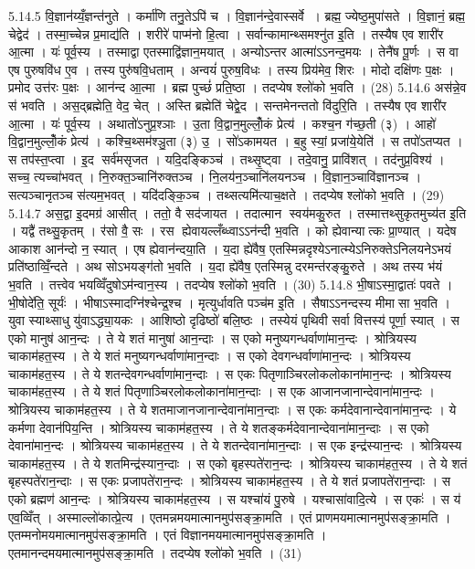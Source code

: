 5.14.5
वि॒ज्ञान॑य्यँ॒ज्ञन्त॑नुते । कर्मा॑णि तनु॒तेऽपि॑ च । वि॒ज्ञान॑न्दे॒वास्सर्वे । ब्रह्म॒ ज्येष्ठ॒मुपा॑सते । वि॒ज्ञानं॒ ब्रह्म॒ चेद्वेद॑ । तस्मा॒च्चेन्न प्र॒माद्य॑ति । शरीरे॑ पाप्म॑नो हि॒त्वा । सर्वान्कामान्थ्समश्नु॑त इ॒ति । तस्यैष एव शारी॑र आ॒त्मा । यः॑ पूर्व॒स्य । तस्माद्वा एतस्माद्वि॑ज्ञान॒मयात् । अन्योऽन्तर आत्मा॑ऽऽनन्द॒मयः । तेनै॑ष पू॒र्णः । स वा एष पुरुषवि॑ध ए॒व । तस्य पुरु॑षवि॒धताम् । अन्वयं॑ पुरुष॒विधः । तस्य प्रिय॑मेव॒ शिरः । मोदो दक्षि॑णः प॒क्षः । प्रमोद उत्त॑रः प॒क्षः । आन॑न्द आ॒त्मा । ब्रह्म पुच्छं॑ प्रति॒ष्ठा । तदप्येष श्लो॑को भ॒वति । (28)
5.14.6
अस॑न्ने॒व स॑ भवति । अस॒द्ब्रह्मेति॒ वेद॒ चेत् । अस्ति ब्रह्मेति॑ चेद्वे॒द । सन्तमेनन्ततो वि॑दुरि॒ति । तस्यैष एव शारी॑र आ॒त्मा । यः॑ पूर्व॒स्य । अथातो॑ऽनुप्र॒श्ञाः । उ॒ता वि॒द्वान॒मुल्लोँ॒कं प्रेत्य॑ । कश्च॒न ग॑च्छ॒ती (३) । आहो॑ वि॒द्वान॒मुल्लोँ॒कं प्रेत्य॑ । कश्चि॒थ्सम॑श्ञु॒ता (३) उ॒ । सो॑ऽकामयत । ब॒हु स्यां॒ प्रजा॑ये॒येति॑ । स तपो॑ऽतप्यत । स तप॑स्त॒प्त्वा । इ॒द सर्व॑मसृजत । यदि॒दङ्किञ्च॑ । तथ्सृ॒ष्ट्वा । तदे॒वानु॒ प्रावि॑शत् । तद॑नुप्र॒विश्य॑ । सच्च॒ त्यच्चा॑भवत् । नि॒रुक्त॒ञ्चानि॑रुक्तञ्च । नि॒लय॑न॒ञ्चानि॑लयनञ्च । वि॒ज्ञान॒ञ्चावि॑ज्ञानञ्च । सत्यञ्चानृतञ्च स॑त्यम॒भवत् । यदि॑दङ्कि॒ञ्च । तथ्सत्यमि॑त्याच॒क्षते । तदप्येष श्लो॑को भ॒वति । (29)
5.14.7
अस॒द्वा इ॒दमग्र॑ आसीत् । ततो॒ वै सद॑जायत । तदात्मान स्वय॑मकु॒रुत । तस्मात्तथ्सुकृतमुच्य॑त इ॒ति । यद्वै॑ तथ्सु॒कृतम् । र॑सो वै॒ सः । रस ह्येवायल्लँब्ध्वाऽऽन॑न्दी भ॒वति । को ह्येवान्यात्कः प्रा॒ण्यात् । यदेष आकाश आन॑न्दो न॒ स्यात् । एष ह्येवान॑न्दया॒ति । य॒दा ह्ये॑वैष॒ एतस्मिन्नदृश्येऽनात्म्येऽनिरुक्तेऽनिलयनेऽभयं प्रति॑ष्ठाव्विँ॒न्दते । अथ सोऽभयङ्ग॑तो भ॒वति । य॒दा ह्ये॑वैष॒ एतस्मिन्नु दरमन्त॑रङ्कु॒रुते । अथ तस्य भ॑यं भ॒वति । तत्त्वेव भयव्विँदुषोऽम॑न्वान॒स्य । तदप्येष श्लो॑को भ॒वति । (30)
5.14.8
भी॒षाऽस्मा॒द्वातः॑ पवते । भी॒षोदे॑ति॒ सूर्यः॑ । भीषाऽस्मादग्नि॑श्चेन्द्र॒श्च । मृत्युर्धावति पञ्च॑म इ॒ति । सैषाऽऽनन्दस्य मीमासा भ॒वति । युवा स्याथ्साधु यु॑वाऽद्ध्या॒यकः । आशिष्ठो दृढिष्ठो॑ बलि॒ष्ठः । तस्येयं पृथिवी सर्वा वित्तस्य॑ पूर्णा॒ स्यात् । स एको मानुष॑ आन॒न्दः । ते ये शतं मानुषा॑ आन॒न्दाः । स एको मनुष्यगन्धर्वाणा॑मान॒न्दः । श्रोत्रियस्य चाकाम॑हत॒स्य । ते ये शतं मनुष्यगन्धर्वाणा॑मान॒न्दाः । स एको देवगन्धर्वाणा॑मान॒न्दः । श्रोत्रियस्य चाकाम॑हत॒स्य । ते ये शतन्देवगन्धर्वाणा॑मान॒न्दाः । स एकः पितृणाञ्चिरलोकलोकाना॑मान॒न्दः । श्रोत्रियस्य चाकाम॑हत॒स्य । ते ये शतं पितृणाञ्चिरलोकलोकाना॑मान॒न्दाः । स एक आजानजानान्देवाना॑मान॒न्दः । श्रोत्रियस्य चाकाम॑हत॒स्य । ते ये शतमाजानजानान्देवाना॑मान॒न्दाः । स एकः कर्मदेवानान्देवाना॑मान॒न्दः । ये कर्मणा देवान॑पिय॒न्ति । श्रोत्रियस्य चाकाम॑हत॒स्य । ते ये शतङ्कर्मदेवानान्देवाना॑मान॒न्दाः । स एको देवाना॑मान॒न्दः । श्रोत्रियस्य चाकाम॑हत॒स्य । ते ये शतन्देवाना॑मान॒न्दाः । स एक इन्द्र॑स्यान॒न्दः । श्रोत्रियस्य चाकाम॑हत॒स्य । ते ये शतमिन्द्र॑स्यान॒न्दाः । स एको बृहस्पते॑रान॒न्दः । श्रोत्रियस्य चाकाम॑हत॒स्य । ते ये शतं बृहस्पते॑रान॒न्दाः । स एकः प्रजापते॑रान॒न्दः । श्रोत्रियस्य चाकाम॑हत॒स्य । ते ये शतं प्रजापते॑रान॒न्दाः । स एको ब्रह्मण॑ आन॒न्दः । श्रोत्रियस्य चाकाम॑हत॒स्य । स यश्चा॑यं पु॒रुषे । यश्चासा॑वादि॒त्ये । स एकः॑ । स य॑ एव॒व्विँत् । अस्माल्लो॑कात्प्रे॒त्य । एतमन्नमयमात्मानमुप॑सङ्क्रा॒मति । एतं प्राणमयमात्मानमुप॑सङ्क्रा॒मति । एतम्मनोमयमात्मानमुप॑सङ्क्रा॒मति । एतं विज्ञानमयमात्मानमुप॑सङ्क्रा॒मति । एतमानन्दमयमात्मानमुप॑सङ्क्रा॒मति । तदप्येष श्लो॑को भ॒वति । (31)
